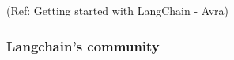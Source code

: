 \begin{frame}[fragile]
\begin{frame}
{\tiny (Ref: Getting started with LangChain - Avra)}
\end{frame}


\begin{frame}[fragile]\frametitle{Langchain’s community}






\end{frame}
\end{frame}
